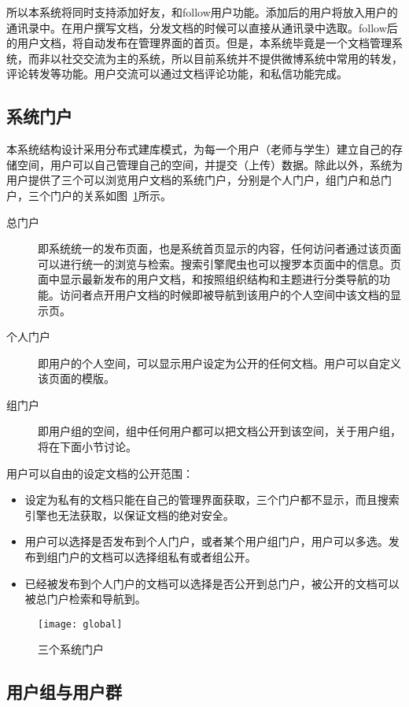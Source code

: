 所以本系统将同时支持添加好友，和follow用户功能。添加后的用户将放入用户的通讯录中。在用户撰写文档，分发文档的时候可以直接从通讯录中选取。follow后的用户文档，将自动发布在管理界面的首页。但是，本系统毕竟是一个文档管理系统，而非以社交交流为主的系统，所以目前系统并不提供微博系统中常用的转发，评论转发等功能。用户交流可以通过文档评论功能，和私信功能完成。

\subsection{系统门户}
\label{sec:global}

本系统结构设计采用分布式建库模式，为每一个用户（老师与学生）建立自己的存储空间，用户可以自己管理自己的空间，并提交（上传）数据。除此以外，系统为用户提供了三个可以浏览用户文档的系统门户，分别是个人门户，组门户和总门户，三个门户的关系如图~\ref{fig:xfig12}所示。
\begin{description}
\item[总门户] 即系统统一的发布页面，也是系统首页显示的内容，任何访问者通过该页面可以进行统一的浏览与检索。搜索引擎爬虫也可以搜罗本页面中的信息。页面中显示最新发布的用户文档，和按照组织结构和主题进行分类导航的功能。访问者点开用户文档的时候即被导航到该用户的个人空间中该文档的显示页。
\item[个人门户] 即用户的个人空间，可以显示用户设定为公开的任何文档。用户可以自定义该页面的模版。
\item[组门户] 即用户组的空间，组中任何用户都可以把文档公开到该空间，关于用户组，将在下面小节讨论。
\end{description}

用户可以自由的设定文档的公开范围：
\begin{itemize}
\item 设定为私有的文档只能在自己的管理界面获取，三个门户都不显示，而且搜索引擎也无法获取，以保证文档的绝对安全。
\item 用户可以选择是否发布到个人门户，或者某个用户组门户，用户可以多选。发布到组门户的文档可以选择组私有或者组公开。
\item 已经被发布到个人门户的文档可以选择是否公开到总门户，被公开的文档可以被总门户检索和导航到。
\end{itemize}

\begin{figure}[H]
  \centering
  \texttt{[image: global]}
  \caption{三个系统门户}
  \label{fig:xfig12}
\end{figure}

\subsection{用户组与用户群}
\label{sec:team}

